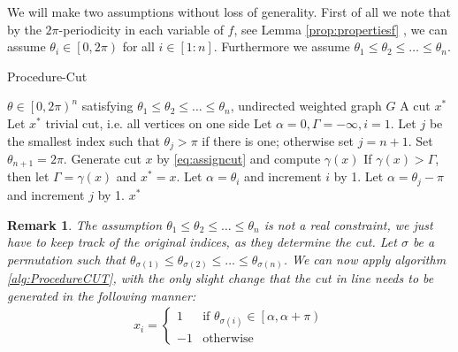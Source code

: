 \documentclass[12pt,a4paper]{article}
\theoremstyle{mythm}
\newtheorem*{rem}{Remark}
\begin{document}
We will make two assumptions without loss of generality. 
First of all we note that by the $ 2\pi $-periodicity in each variable of $ f $, see Lemma \ref{prop:propertiesf} , we can assume $ \theta_i \in \left[ 0,2\pi \right)  $ for all $ i
\in \left[ 1:n \right]  $.
Furthermore we assume $ \theta_1 \leq \theta_2 \leq \dots \leq \theta_n  $.
\begin{algorithm}
\caption{Procedure-Cut}
\label{alg:ProcedureCUT} 
\begin{algorithmic}[1]
\Require $ \theta \in \left[ 0, 2 \pi  \right) ^{ n }   $ satisfying $ \theta_1 \leq \theta_2 \leq \dots \leq \theta_n    $, undirected weighted graph $ G $
\Ensure A cut $ x^* $
\State Let $ x^* $ trivial cut, i.e. all vertices on one side
\State Let $ \alpha =0, \Gamma = -\infty , i =1 $. Let $ j $ be the smallest index such that $ \theta_j > \pi $ if there is one; otherwise set $ j = n+1 $. Set $ \theta _{ n+1
} = 2\pi $.
\While{ $ \alpha < \pi $}
\State Generate cut $ x $ by \ref{eq:assigncut} and compute $ \gamma (x) $
\label{gencut} 
\State If $ \gamma (x) > \Gamma $, then let $ \Gamma = \gamma (x) $ and $ x^* = x $.
  \State Let $ \alpha = \theta_i $ and increment $ i $ by 1.
\Else 
\State Let $ \alpha = \theta_j - \pi $ and increment $ j $ by 1.
\EndIf
\EndWhile
\State \Return $ x ^{ * }  $
\end{algorithmic}
\end{algorithm}
\begin{rem}
The assumption $ \theta_1 \leq \theta_2 \leq \dots \leq \theta_n  $ is not a real constraint, we just have to keep track of the original indices, as they determine the cut.
Let $ \sigma $ be a permutation such that $ \theta _{ \sigma (1) } \leq \theta _{ \sigma (2) } \leq \dots \leq \theta _{ \sigma (n) }  $. 
We can now apply algorithm \ref{alg:ProcedureCUT}, with the only slight change that the cut in line  needs to be generated in the following manner:
\begin{align*}
x_i = \begin{cases}
1 & \text{if } \theta _{ \sigma (i) } \in \left[ \alpha, \alpha + \pi  \right)  \\
-1 & \text{otherwise} 
\end{cases}
\end{align*} 
\end{rem} 
\end{document}

